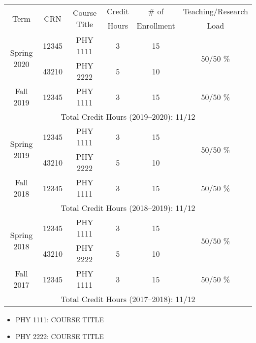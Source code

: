 \newpage
{}
\label{Teaching_Load}

\newpage



\begin{table}[H]
  \centering
\begin{tcolorbox}[colback=yellow!10!white,colframe=csuOrange,title= \caption{
  \textcolor{white}{List of the courses taught by Dr. X in the \underline{last six semesters}.}}]
\begin{tabularx}{\linewidth}{ c||c|c|c|c|c }
  \toprule
\multirow{2}{*}{Term} & \multirow{2}{*}{CRN} & \multirow{2}{*}{Course Title} & Credit & \# of  & Teaching/Research    \\
 &  &     & Hours & Enrollment &  Load    \\
\midrule
\midrule
\multirow{2}{*}{Spring 2020}
&  12345   & PHY 1111  & 3   & 15 & \multirow{2}{*}{50/50 \%} \\
&  43210   & PHY 2222  & 5    & 10 \\
\hline
%
\multirow{1}{*}{Fall 2019}
&  12345   & PHY 1111  & 3   & 15 & \multirow{1}{*}{50/50 \%} \\
\bottomrule
%
\multicolumn{6}{c}{Total Credit Hours (2019--2020): 11/12} \\
\bottomrule
%
\multirow{2}{*}{Spring 2019}
&  12345   & PHY 1111  & 3   & 15 & \multirow{2}{*}{50/50 \%} \\
&  43210   & PHY 2222  & 5    & 10 \\
\hline
%
\multirow{1}{*}{Fall 2018}
&  12345   & PHY 1111  & 3   & 15 & \multirow{1}{*}{50/50 \%} \\
\bottomrule
%
\multicolumn{6}{c}{Total Credit Hours (2018--2019): 11/12} \\
\bottomrule
%
\multirow{2}{*}{Spring 2018}
&  12345   & PHY 1111  & 3   & 15 & \multirow{2}{*}{50/50 \%} \\
&  43210   & PHY 2222  & 5    & 10 \\
\hline
%
\multirow{1}{*}{Fall 2017}
&  12345   & PHY 1111  & 3   & 15 & \multirow{1}{*}{50/50 \%} \\
\bottomrule
%
\multicolumn{6}{c}{Total Credit Hours (2017--2018): 11/12} \\
\bottomrule
%
%
\end{tabularx}

\vskip1cm
{\footnotesize
%
\begin{itemize}
\item PHY 1111: COURSE TITLE
\item PHY 2222: COURSE TITLE
\end{itemize}
%
}

\end{tcolorbox}
\end{table}

